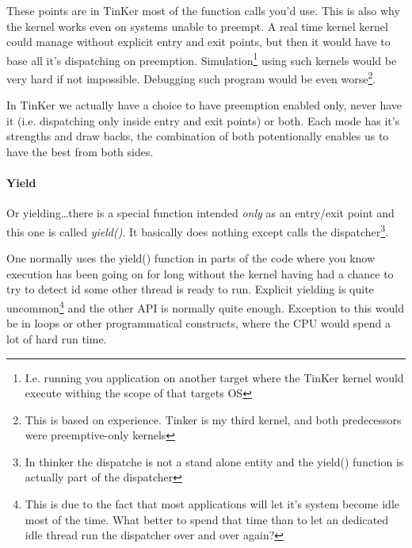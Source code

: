 		These points are in TinKer most of the function calls you'd use. This is also why the kernel works even on systems unable to preempt. A real time kernel kernel could manage without explicit entry and exit points, but then it would have to base all it's dispatching on preemption. Simulation\footnote{I.e. running you application on another target where the TinKer kernel would execute withing the scope of that targets OS} using such kernels would be very hard if not impossible. Debugging such program would be even worse\footnote{This is based on experience. Tinker is my third kernel, and both predecessors were preemptive-only kernels}. 

		In TinKer we actually have a choice to have preemption enabled only, never have it (i.e. dispatching only inside entry and exit points) or both. Each mode has it's strengths and draw backs, the combination of both potentionally enables us to have the best from both sides.

		\paragraph{Yield} Or yielding\ldots there is a special function intended \textit{only} as an entry/exit point and this one is called \textit{yield()}. It basically does nothing except calls the dispatcher\footnote{In thinker the dispatche is not a stand alone entity and the yield() function is actually part of the dispatcher}. 

		One normally uses the yield() function in parts of the code where you know execution has been going on for long without the kernel having had a chance to try to detect id some other thread is ready to run. Explicit yielding is quite uncommon\footnote{This is due to the fact that most applications will let it's system become idle most of the time. What better to spend that time than to let an dedicated idle thread run the dispatcher over and over again?} and the other API is normally quite enough. Exception to this would be in loops or other programmatical constructs, where the CPU would spend a lot of hard run time.

		

		

